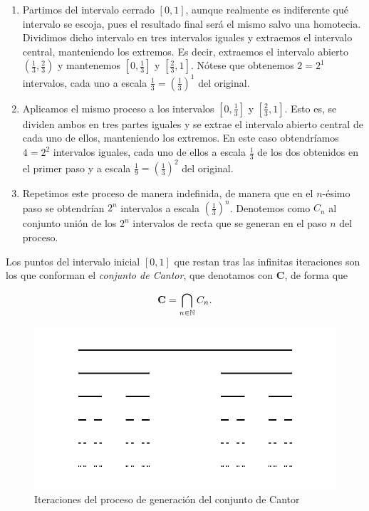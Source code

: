 \begin{enumerate}
\item Partimos del intervalo cerrado $[0,1]$, aunque realmente es indiferente qué intervalo se escoja, pues el resultado final será el mismo salvo una homotecia. Dividimos dicho intervalo en tres intervalos iguales y extraemos el intervalo central, manteniendo los extremos. Es decir, extraemos el intervalo abierto $\left(\frac 1 3, \frac 2 3\right)$ y mantenemos $\left[0,\frac 1 3\right]$ y $\left[\frac 2 3, 1\right]$. Nótese que obtenemos $2=2^1$ intervalos, cada uno a escala $\frac 1 3=\left(\frac 1 3\right)^1$ del original.

\item Aplicamos el mismo proceso a los intervalos $\left[0,\frac 1 3\right]$ y $\left[\frac 2 3, 1\right]$. Esto es, se dividen ambos en tres partes iguales y se extrae el intervalo abierto central de cada uno de ellos, manteniendo los extremos. En este caso obtendríamos $4=2^2$ intervalos iguales, cada uno de ellos a escala $\frac 1 3$ de los dos obtenidos en el primer paso y a escala $\frac 1 9=\left(\frac 1 3\right)^2$ del original.

\item Repetimos este proceso de manera indefinida, de manera que en el $n$-ésimo paso se obtendrían $2^n$ intervalos a escala $\left(\frac 1 3\right)^n$. Denotemos como $C_n$ al conjunto unión de los $2^n$ intervalos de recta que se generan en el paso $n$ del proceso.
\end{enumerate} 

Los puntos del intervalo inicial $[0,1]$ que restan tras las infinitas iteraciones son los que conforman el \textit{conjunto de Cantor}, que denotamos con $\mathbf{C}$, de forma que 

$$\mathbf{C}=\bigcap_{n\in\mathbb{N}}C_n.$$

\begin{figure} [ht]
\centering
\includegraphics[scale = 0.4]{img/cantor.png}
\caption{Iteraciones del proceso de generación del conjunto de Cantor}
 \label{fig:Cantor}
\end{figure}

